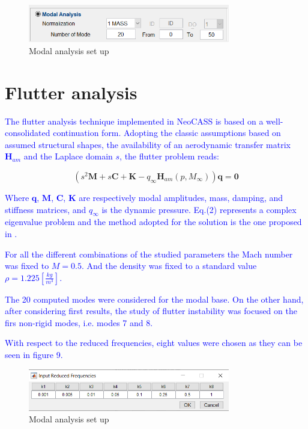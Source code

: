 \documentclass[conference]{IEEEtran}
\newlength\figureheight
\newlength\figurewidth
\begin{document}
\begin{figure}[htp]
  \centering
  \setlength\figureheight{5cm}
  \setlength\figurewidth{6cm}
  \includegraphics[width=250pt]{images/ModalGUI.png}
  \caption{Modal analysis set up}
  \label{fig:my-figure}
\end{figure}


\section{Flutter analysis}
\textcolor{blue}{The flutter analysis technique implemented in NeoCASS is based on a well-consolidated continuation form.
Adopting the classic assumptions based on assumed structural shapes, the availability of an aerodynamic
transfer matrix $\textbf{H}_{am}$ and the Laplace domain $s$, the flutter problem reads\cite{cavagna2011aeroelastic}:}

\begin{equation}
    (s^2 \textbf{M} + s \textbf{C} + \textbf{K} - q_{\infty} \textbf{H}_{am}(p,M_\infty))\textbf{q}=\textbf{0}
\end{equation}

\textcolor{blue}{Where $\textbf{q}$, $\textbf{M}$, $\textbf{C}$, $\textbf{K}$ are respectively modal amplitudes, mass, damping, and stiffness matrices, and $q_\infty$ is the dynamic pressure. Eq.(2) represents a complex eigenvalue problem and the method adopted for the solution is the one proposed in \cite{cardani1978continuation}.}

\textcolor{blue}{For all the different combinations of the studied parameters the Mach number was fixed to $M = 0.5$. And the density was fixed to a standard value $\rho = 1.225 [\frac{kg}{m^3}]$.}

\textcolor{blue}{The 20 computed modes were considered for the modal base. On the other hand, after considering first results, the study of flutter instability was focused on the firs non-rigid modes, i.e. modes 7 and 8.}

\textcolor{blue}{With respect to the reduced frequencies, eight values were chosen as they can be seen in figure 9.}

\begin{figure}[htp]
  \centering
  \setlength\figureheight{5cm}
  \setlength\figurewidth{6cm}
  \includegraphics[width=250pt]{images/ReducedFreqGUI.png}
  \caption{Modal analysis set up}
  \label{fig:my-figure}
\end{figure}
\end{document}
